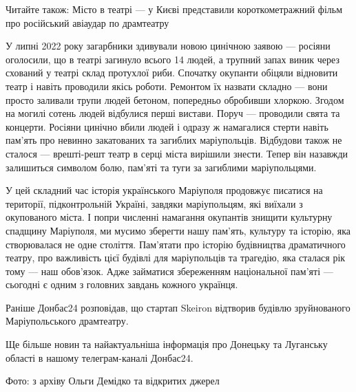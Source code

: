 Читайте також: Місто в театрі — у Києві представили короткометражний фільм про
російський авіаудар по драмтеатру

У липні 2022 року загарбники здивували новою цинічною заявою — росіяни
оголосили, що в театрі загинуло всього 14 людей, а трупний запах виник через
схований у театрі склад протухлої риби. Спочатку окупанти обіцяли відновити
театр і навіть проводили якісь роботи. Ремонтом їх назвати складно — вони
просто заливали трупи людей бетоном, попередньо обробивши хлоркою. Згодом на
могилі сотень людей відбулися перші вистави. Поруч — проводили свята та
концерти. Росіяни цинічно вбили людей і одразу ж намагалися стерти навіть
пам'ять про невинно закатованих та загиблих маріупольців. Відбудови також не
сталося — врешті-решт театр в серці міста вирішили знести. Тепер він назавжди
залишиться символом болю, пам'яті та туги за загиблими маріупольцями.

У цей складний час історія українського Маріуполя продовжує писатися на
території, підконтрольній Україні, завдяки маріупольцям, які виїхали з
окупованого міста. І попри численні намагання окупантів знищити культурну
спадщину Маріуполя, ми мусимо зберегти нашу пам'ять, культуру та історію, яка
створювалася не одне століття. Пам'ятати про історію будівництва драматичного
театру, про важливість цієї будівлі для маріупольців та трагедію, яка сталася
рік тому — наш обов'язок. Адже займатися збереженням національної пам'яті —
сьогодні є одним з головних завдань кожного українця.

Раніше Донбас24 розповідав, що стартап Skeiron відтворив будівлю зруйнованого
Маріупольського драмтеатру.

Ще більше новин та найактуальніша інформація про Донецьку та Луганську області
в нашому телеграм-каналі Донбас24.

Фото: з архіву Ольги Демідко та відкритих джерел
